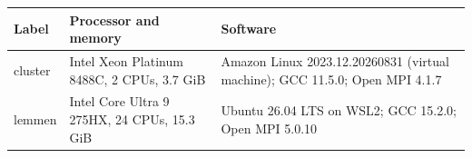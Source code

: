 \begin{tabular}{@{}l p{3.0cm} p{3.6cm}@{}}
\toprule
Label & Processor and memory & Software \\
\midrule
cluster & Intel Xeon Platinum 8488C, 2 CPUs, 3.7 GiB & Amazon Linux 2023.12.20260831 (virtual machine); GCC 11.5.0; Open MPI 4.1.7 \\
lemmen & Intel Core Ultra 9 275HX, 24 CPUs, 15.3 GiB & Ubuntu 26.04 LTS on WSL2; GCC 15.2.0; Open MPI 5.0.10 \\
\bottomrule
\end{tabular}
